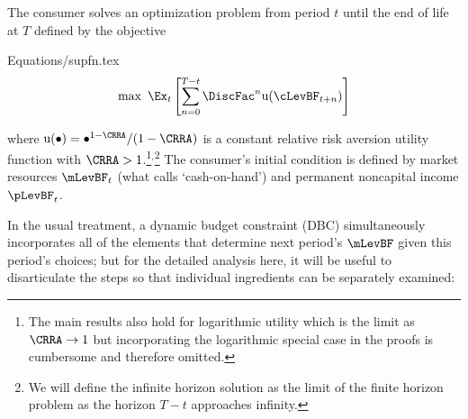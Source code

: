 \documentclass[titlepage]{\econtex}\providecommand{\texname}{BufferStockTheory}%
\providecommand{\EqDir}{Equations}
\begin{document}
The consumer solves an optimization problem from period
$t$ until the end of life at $T$ defined by the objective
\begin{verbatimwrite}{\EqDir/supfn.tex}
\begin{eqnarray}
  \label{eq:supfn}
  \max~ \Ex_{t}\left[\sum_{n=0}^{T-t} \DiscFac^{n} \util(\cLevBF_{t+n})\right]
\end{eqnarray}
\end{verbatimwrite}

where
$\util(\bullet)=\bullet^{1-\CRRA}/(1-\CRRA)$ is a constant relative
risk aversion utility function with $\CRRA > 1$.\footnote{The main
  results also hold for logarithmic utility which is the limit as
  $\CRRA \rightarrow 1$ but incorporating the logarithmic special case
  in the proofs is cumbersome and therefore
  omitted.}$^{,}$\footnote{We will define the infinite horizon
  solution as the limit of the finite horizon problem as the horizon
  $T-t$ approaches infinity.}  The consumer's initial condition is
defined by market resources $\mLevBF_{t}$ (what \cite{deatonLiqConstr}
calls `cash-on-hand') and permanent noncapital income $\pLevBF_{t}$.

In the usual treatment, a dynamic budget constraint (DBC) simultaneously incorporates
all of the elements that determine next period's $\mLevBF$ given this
period's choices; but for the detailed analysis here, it will be useful to
disarticulate the steps so that individual ingredients can be separately examined:
\end{document}
